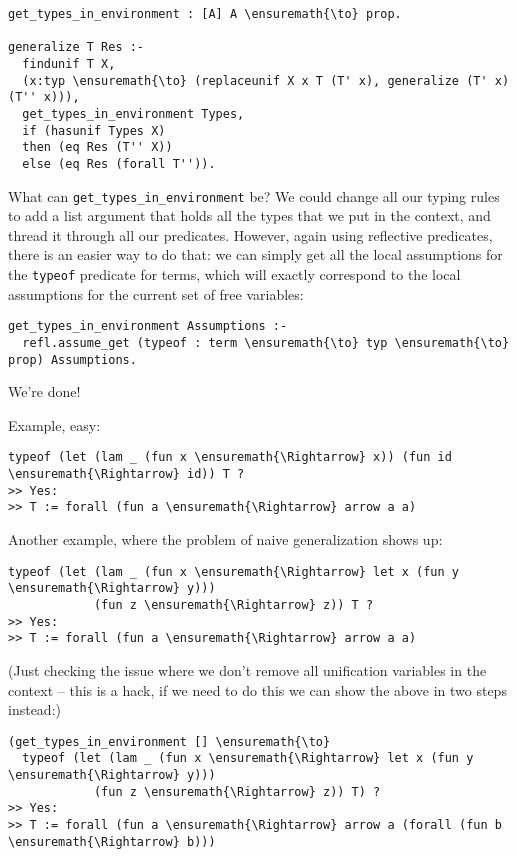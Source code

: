 \begin{verbatim}
get_types_in_environment : [A] A \ensuremath{\to} prop.

generalize T Res :-
  findunif T X,
  (x:typ \ensuremath{\to} (replaceunif X x T (T' x), generalize (T' x) (T'' x))),
  get_types_in_environment Types,
  if (hasunif Types X)
  then (eq Res (T'' X))
  else (eq Res (forall T'')).
\end{verbatim}

What can \texttt{get\_types\_in\_environment} be? We could change all
our typing rules to add a list argument that holds all the types that we
put in the context, and thread it through all our predicates. However,
again using reflective predicates, there is an easier way to do that: we
can simply get all the local assumptions for the \texttt{typeof}
predicate for terms, which will exactly correspond to the local
assumptions for the current set of free variables:

\begin{verbatim}
get_types_in_environment Assumptions :-
  refl.assume_get (typeof : term \ensuremath{\to} typ \ensuremath{\to} prop) Assumptions.
\end{verbatim}

We're done!

Example, easy:

\begin{verbatim}
typeof (let (lam _ (fun x \ensuremath{\Rightarrow} x)) (fun id \ensuremath{\Rightarrow} id)) T ?
>> Yes:
>> T := forall (fun a \ensuremath{\Rightarrow} arrow a a)
\end{verbatim}

Another example, where the problem of naive generalization shows up:

\begin{verbatim}
typeof (let (lam _ (fun x \ensuremath{\Rightarrow} let x (fun y \ensuremath{\Rightarrow} y)))
            (fun z \ensuremath{\Rightarrow} z)) T ?
>> Yes:
>> T := forall (fun a \ensuremath{\Rightarrow} arrow a a)
\end{verbatim}

(Just checking the issue where we don't remove all unification variables
in the context -- this is a hack, if we need to do this we can show the
above in two steps instead:)

\begin{verbatim}
(get_types_in_environment [] \ensuremath{\to}
  typeof (let (lam _ (fun x \ensuremath{\Rightarrow} let x (fun y \ensuremath{\Rightarrow} y)))
            (fun z \ensuremath{\Rightarrow} z)) T) ?
>> Yes:
>> T := forall (fun a \ensuremath{\Rightarrow} arrow a (forall (fun b \ensuremath{\Rightarrow} b)))
\end{verbatim}
